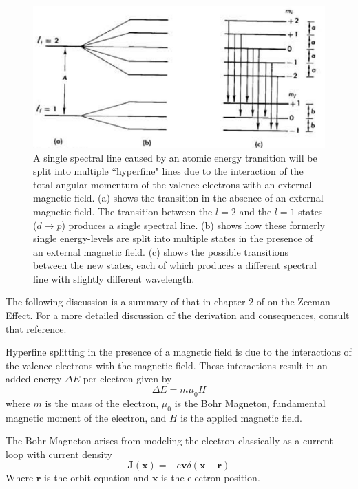 \documentclass[twocolumn]{article}
\begin{document}
		\begin{figure}
			\centering
			\includegraphics[width=1.0\linewidth]{Images/SpectralSplitting}
			\caption{A single spectral line caused by an atomic energy transition will be split into multiple ``hyperfine" lines due to the interaction of the total angular momentum of the valence electrons with an external magnetic field. (a) shows the transition in the absence of an external magnetic field. The transition between the $l=2$ and the $l=1$ states ($d\rightarrow p$) produces a single spectral line. (b) shows how these formerly single energy-levels are split into multiple states in the presence of an external magnetic field. (c) shows the possible transitions between the new states, each of which produces a different spectral line with slightly different wavelength.}
			\label{fig:SpectralSplitting}
		\end{figure}
		
		The following discussion is a summary of that in chapter 2 of \cite{melissinos_experiments_1966} on the Zeeman Effect.
		For a more detailed discussion of the derivation and consequences, consult that reference.
		
		Hyperfine splitting in the presence of a magnetic field is due to the interactions of the valence electrons with the magnetic field.
		These interactions result in an added energy $\Delta E$ per electron given by
		\begin{equation}
			\Delta E = m\mu_0H
		\end{equation}
		where $m$ is the mass of the electron, $\mu_0$ is the Bohr Magneton, fundamental magnetic moment of the electron, and $H$ is the applied magnetic field.
		
		The Bohr Magneton arises from modeling the electron classically as a current loop with current density
		\begin{equation}
			\mathbf{J(x)} = -e\mathbf{v} \delta\left(\mathbf{x} - \mathbf{r}\right)
		\end{equation}
		Where $\mathbf{r}$ is the orbit equation and $\mathbf{x}$ is the electron position.
		
\end{document}
